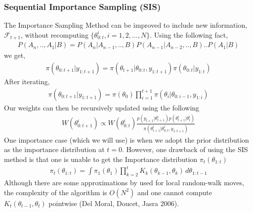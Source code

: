 \documentclass[12pt]{article}
\theoremstyle{definition}
\begin{document}
\subsubsection{Sequential Importance Sampling (SIS)}
The Importance Sampling Method can be improved to include new information, $\mathcal{F}_{t+1}$, without recomputing $\{\theta_{0:t}^{i},i=1,2,...,N\}$. Using the following fact,
\begin{equation}
	\begin{aligned}
		P(A_{n},..,A_{1}|B) = P(A_{n}|A_{n-1},..,B)P(A_{n-1}|A_{n-2},..,B)..P(A_{1}|B)
	\end{aligned}
\end{equation}
we get,
\begin{equation}
	\begin{aligned}
		\pi(\theta_{0:t+1}|y_{1:t+1}) = \pi(\theta_{t+1}|\theta_{0:t},y_{1:t+1})\pi(\theta_{0:t}|y_{1:t})
	\end{aligned}
\end{equation}
After iterating,
\begin{equation}
	\begin{aligned}
		\pi(\theta_{0:t+1}|y_{1:t+1}) = \pi(\theta_{0})\prod_{i=1}^{t+1}\pi(\theta_{i}|\theta_{0:i-1},y_{1:i})
	\end{aligned}
\end{equation}
Our weights can then be recursively updated using the following
\begin{equation}
	\begin{aligned}
		W(\theta_{0:t+1}^{i}) \propto W(\theta_{0:t}^{i}) \frac{p(y_{t+1}|\theta_{t+1}^{i})p(\theta_{t+1}^{i}|\theta_{t}^{i})}{\pi(\theta_{t+1}^{i}|\theta_{0:t}^{i},y_{1:t+1})}
	\end{aligned}
\end{equation}
One importance case (which we will use) is when we adopt the prior distribution as the importance distribution at $t=0$. However, one drawback of using the SIS method is that one is unable to get the Importance distribution $\pi_{t}(\theta_{1:t})$
\begin{equation}
	\begin{aligned}
		\pi_{t}(\theta_{1:t}) = \int \pi_{1}(\theta_{1})\prod_{k=2}^{t}K_{k}(\theta_{k-1},\theta_{k}) \,d\theta_{1:t-1}
	\end{aligned}
\end{equation}
Although there are some approximations by used for local random-walk moves, the complexity of the algorithm is $O(N^2)$ and one cannot compute $K_{t}(\theta_{t-1},\theta_{t})$ pointwise (Del Moral, Doucet, Jasra 2006).
\end{document}

